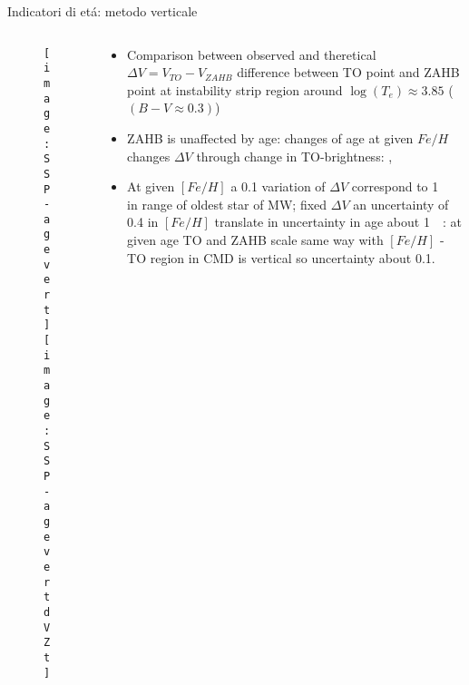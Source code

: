 \begin{frame}{Indicatori di et\'a: metodo verticale}
\begin{columns}[T]
	\begin{column}{0.5\textwidth}
	\begin{figure}[!ht]
	\texttt{[image: SSP-agevert]}\label{fig:SSP-agevert}
	\texttt{[image: SSP-agevertdVZt]}\label{fig:SSP-agevertdVZt}
	\end{figure}
	\end{column}
	\begin{column}{0.45\textwidth}
	\begin{itemize}
	\item Comparison between observed and theretical $\Delta V=V_{TO}-V_{ZAHB}$ difference between TO point and ZAHB point at instability strip region around $\log(T_e)\approx3.85$ ($(B-V\approx0.3)$)
	\item ZAHB is unaffected by age: changes of age at given $Fe/H$ changes $\Delta V$ through change in TO-brightness: , 
	\item At given $[Fe/H]$ a \SI{0.1}{\mag} variation of $\Delta V$ correspond to \SI{1}{\giga\year} in range of oldest star of MW; fixed $\Delta V$ an uncertainty of \SI{0.4}{\dex} in $[Fe/H]$ translate in uncertainty in age about \SI{1}{\giga\year}: at given age TO and ZAHB scale  same way with $[Fe/H]$ - TO region in CMD is vertical so uncertainty about \SI{0.1}{\mag}.
	\end{itemize}
	\end{column}
\end{columns}
\end{frame}

